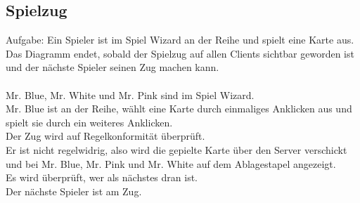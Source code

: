 \documentclass{article}
\begin{document}
\subsection{Spielzug}
		Aufgabe: Ein Spieler ist im Spiel Wizard an der Reihe und spielt eine Karte aus.
		Das Diagramm endet, sobald der Spielzug auf allen Clients sichtbar
		geworden ist und der nächste Spieler seinen Zug machen kann.\\
		\ \\
		Mr. Blue, Mr. White und Mr. Pink sind im Spiel Wizard. \\
		Mr. Blue ist an der Reihe, wählt eine Karte durch einmaliges Anklicken aus und spielt sie durch ein weiteres Anklicken.\\
		Der Zug wird auf Regelkonformität überprüft.\\
		Er ist nicht regelwidrig, also wird die gepielte Karte über den Server verschickt und bei Mr. Blue, Mr. Pink und Mr. White auf dem Ablagestapel angezeigt. \\
		Es wird überprüft, wer als nächstes dran ist.\\
		Der nächste Spieler ist am Zug. \\
\newpage
\addtolength{\oddsidemargin}{-4cm}
\addtolength{\topmargin}{-4cm}
\end{document}
